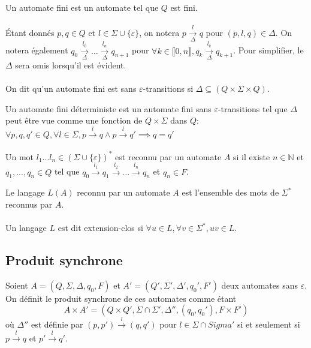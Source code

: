 \documentclass[10pt,a4paper]{article}
\newcommand{\enum}[2]{\llbracket #1, #2 \rrbracket}
\begin{document}
Un automate fini est un automate tel que $Q$ est fini.
\paragraph{}
\'Etant donn\'es $p,q \in Q$ et $l\in \Sigma \cup \{\varepsilon\}$, on notera $p \underset{\Delta}{\overset{l}{{\to}}}q$ pour $(p,l,q) \in \Delta$. On notera \'egalement $q_0 \underset{\Delta}{\overset{l_0}{{\to}}} \dots \underset{\Delta}{\overset{l_n}{{\to}}} q_{n+1}$ pour $\forall k \in \enum{0}{n}, q_k 
\underset{\Delta}{\overset{l_k}{{\to}}} q_{k+1}$. Pour simplifier, le $\Delta$ sera omis lorsqu'il est \'evident.
\paragraph{}
On dit qu'un automate fini est sans $\varepsilon$-transitions si $\Delta \subseteq (Q\times \Sigma \times Q)$.

Un automate fini d\'eterministe est un automate fini sans $\varepsilon$-transitions tel que $\Delta$ peut \^etre vue comme une fonction de $Q\times \Sigma$ dans $Q$: $\forall p,q,q' \in Q, \forall l \in \Sigma, p\overset{l}{{\to}}q \land p\overset{l}{{\to}}q' \implies q=q'$
\paragraph{}
Un mot $l_1...l_n \in \left(\Sigma\cup \{\varepsilon\}\right)^*$ est reconnu par un automate $A$ si il existe $n \in \mathbb N$ et $q_1,...,q_n \in Q$ tel que $q_0 \overset{l_1}{{\to}} q_1 \overset{l_2}{{\to}} \dots \overset{l_n}{{\to}} q_{n}$ et $q_{n} \in F$.

Le langage $L(A)$ reconnu par un automate $A$ est l'ensemble des mots de $\Sigma^*$ reconnus par $A$.

\paragraph{}
Un langage $L$ est dit extension-clos si $\forall u \in L, \forall v \in \Sigma^*, uv \in L$.

\subsection{Produit synchrone}

Soient $A = (Q, \Sigma, \Delta, q_0, F)$ et $A' = (Q', \Sigma', \Delta', q_0', F')$ deux automates sans $\varepsilon$. On définit le produit synchrone de ces automates comme \'etant $$A\times A' = (Q \times Q', \Sigma \cap \Sigma', \Delta'', (q_0, q_0'), F\times F')$$ o\`u $\Delta''$ est d\'efinie par $(p,p')\overset{l}{{\to}}(q,q')$ pour $l\in \Sigma\cap Sigma'$ si et seulement si $p\overset{l}{{\to}}q$ et $p'\overset{l}{{\to}}q'$.
\end{document}
